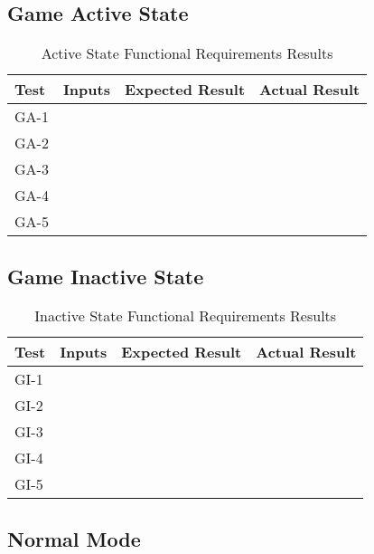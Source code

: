 \documentclass[12pt, titlepage]{article}
\begin{document}
\subsection{Game Active State}

\begin{table}[H]
  \centering
    \setlength{\leftmargini}{0cm}
    \begin{tabular}{| >{\centering\arraybackslash}m{1.5cm} | 
      >{\centering\arraybackslash}m{4cm} | 
      >{\centering\arraybackslash}m{4cm} | 
      >{\centering\arraybackslash}m{4cm} |}
    \hline
    \rowcolor[gray]{0.9}
    Test & Inputs & Expected Result & Actual Result\\
    \hline
    GA-1 &  &  & \\
    \hline
    GA-2 &  &  & \\
    \hline
    GA-3 &  &  & \\
    \hline
    GA-4 &  &  & \\
    \hline
    GA-5 &  &  & \\
    \hline
    \end{tabular}
  \caption{Active State Functional Requirements Results}
\end{table}

\subsection{Game Inactive State}

\begin{table}[H]
  \centering
    \setlength{\leftmargini}{0cm}
    \begin{tabular}{| >{\centering\arraybackslash}m{1.5cm} | 
      >{\centering\arraybackslash}m{4cm} | 
      >{\centering\arraybackslash}m{4cm} | 
      >{\centering\arraybackslash}m{4cm} |}
    \hline
    \rowcolor[gray]{0.9}
    Test & Inputs & Expected Result & Actual Result\\
    \hline
    GI-1 &  &  & \\
    \hline
    GI-2 &  &  & \\
    \hline
    GI-3 &  &  & \\
    \hline
    GI-4 &  &  & \\
    \hline
    GI-5 &  &  & \\
    \hline
    \end{tabular}
  \caption{Inactive State Functional Requirements Results}
\end{table}

\subsection{Normal Mode}
\end{document}
